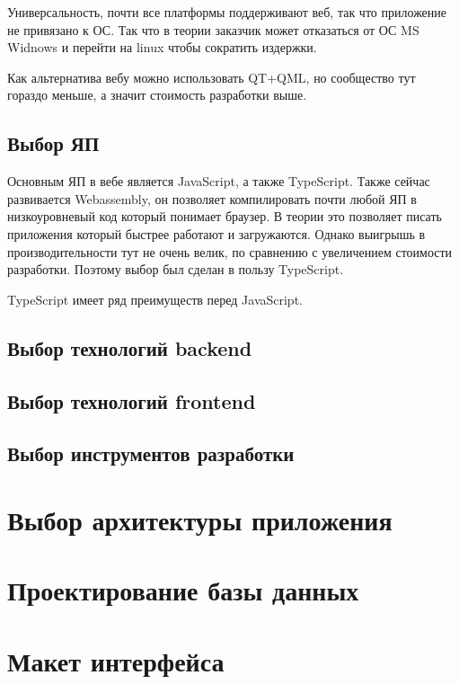\documentclass[a4paper,article,14pt]{extarticle}
\begin{document}
Универсальность, почти все платформы поддерживают веб, так что приложение не привязано к ОС.
Так что в теории заказчик может отказаться от ОС MS Widnows и перейти на linux чтобы сократить издержки.

Как альтернатива вебу можно использовать QT+QML, но сообщество тут гораздо меньше, а значит стоимость разработки выше.

\subsection{Выбор ЯП}

Основным ЯП в вебе является JavaScript, а также TypeScript. 
Также сейчас развивается Webassembly, он позволяет компилировать почти любой ЯП в низкоуровневый код который понимает браузер.
В теории это позволяет писать приложения который быстрее работают и загружаются. Однако выигрышь в производительности тут не очень велик, 
по сравнению с увеличением стоимости разработки. Поэтому выбор был сделан в пользу TypeScript.

TypeScript имеет ряд преимуществ перед JavaScript.

\subsection{Выбор технологий backend}

\subsection{Выбор технологий frontend}

\subsection{Выбор инструментов разработки}

\section{Выбор архитектуры приложения}

\section{Проектирование базы данных}

\section{Макет интерфейса}
\end{document}
